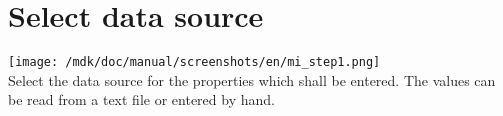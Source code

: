 \section{Select data source}
\texttt{[image: /mdk/doc/manual/screenshots/en/mi\_step1.png]} \\
Select the data source for the properties which shall be entered. The values can be read from a text file or entered by hand.\\
